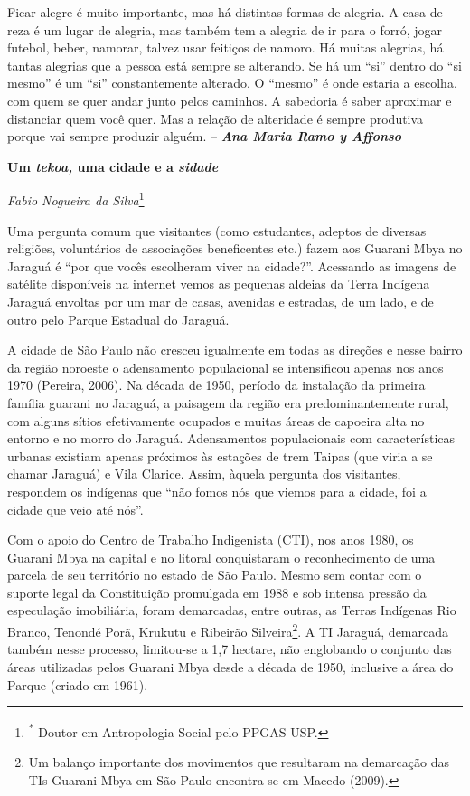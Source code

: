 Ficar alegre é muito importante, mas há distintas formas de alegria. A
casa de reza é um lugar de alegria, mas também tem a alegria de ir para
o forró, jogar futebol, beber, namorar, talvez usar feitiços de namoro.
Há muitas alegrias, há tantas alegrias que a pessoa está sempre se
alterando. Se há um ``si'' dentro do ``si mesmo'' é um ``si''
constantemente alterado. O ``mesmo'' é onde estaria a escolha, com quem
se quer andar junto pelos caminhos. A sabedoria é saber aproximar e
distanciar quem você quer. Mas a relação de alteridade é sempre
produtiva porque vai sempre produzir alguém. -- \emph{\textbf{Ana Maria
Ramo y Affonso}}

\textbf{Um \emph{tekoa,} uma cidade e a \emph{sidade}}

\emph{Fabio Nogueira da Silva}\footnote{\textsuperscript{*} Doutor em
  Antropologia Social pelo PPGAS-USP.}

Uma pergunta comum que visitantes (como estudantes, adeptos de diversas
religiões, voluntários de associações beneficentes etc.) fazem aos
Guarani Mbya no Jaraguá é ``por que vocês escolheram viver na cidade?''.
Acessando as imagens de satélite disponíveis na internet vemos as
pequenas aldeias da Terra Indígena Jaraguá envoltas por um mar de casas,
avenidas e estradas, de um lado, e de outro pelo Parque Estadual do
Jaraguá.

A cidade de São Paulo não cresceu igualmente em todas as direções e
nesse bairro da região noroeste o adensamento populacional se
intensificou apenas nos anos 1970 (Pereira, 2006). Na década de 1950,
período da instalação da primeira família guarani no Jaraguá, a paisagem
da região era predominantemente rural, com alguns sítios efetivamente
ocupados e muitas áreas de capoeira alta no entorno e no morro do
Jaraguá. Adensamentos populacionais com características urbanas existiam
apenas próximos às estações de trem Taipas (que viria a se chamar
Jaraguá) e Vila Clarice. Assim, àquela pergunta dos visitantes,
respondem os indígenas que ``não fomos nós que viemos para a cidade, foi
a cidade que veio até nós''.

Com o apoio do Centro de Trabalho Indigenista (CTI), nos anos 1980, os
Guarani Mbya na capital e no litoral conquistaram o reconhecimento de
uma parcela de seu território no estado de São Paulo. Mesmo sem contar
com o suporte legal da Constituição promulgada em 1988 e sob intensa
pressão da especulação imobiliária, foram demarcadas, entre outras, as
Terras Indígenas Rio Branco, Tenondé Porã, Krukutu e Ribeirão
Silveira\footnote{Um balanço importante dos movimentos que resultaram na
  demarcação das TIs Guarani Mbya em São Paulo encontra-se em Macedo
  (2009).}. A TI Jaraguá, demarcada também nesse processo, limitou-se a
1,7 hectare, não englobando o conjunto das áreas utilizadas pelos
Guarani Mbya desde a década de 1950, inclusive a área do Parque (criado
em 1961).

